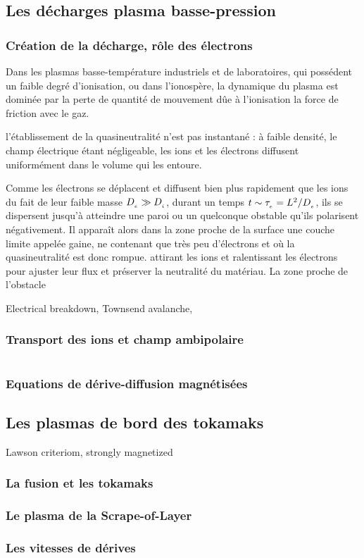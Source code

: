 \begin{refsection}
\subsection{Les décharges plasma basse-pression}
\label{1-transportAmbipolaire}

\subsubsection{Création de la décharge, rôle des électrons}

Dans les plasmas basse-température industriels et de laboratoires, qui
possédent un faible degré d'ionisation, ou dans l'ionospère, la dynamique du
plasma est dominée par la perte de quantité de mouvement dûe à l'ionisation la force de friction avec
le gaz.

l'établissement de la quasineutralité n'est pas instantané : à faible densité,
le champ électrique étant négligeable, les ions et les électrons diffusent
uniformément dans le volume qui les entoure.

Comme les électrons se déplacent et diffusent bien plus rapidement que les ions
du fait de leur faible masse $D_{_{e}}\gg D_{_{i}}$, durant un temps
$t\sim \tau_{_{e}}=L^{{2}}/D_{_{e}}$, ils se dispersent jusqu'à atteindre
une paroi ou un quelconque obstable qu'ils polarisent négativement. Il apparaît
alors dans la zone proche de la surface une couche limite appelée gaine, ne
contenant que très peu d'électrons et où la quasineutralité est donc rompue. 
attirant les ions et ralentissant les électrons pour ajuster leur flux et préserver la neutralité du matériau. La zone proche de l'obstacle 



Electrical breakdown, Townsend avalanche,
\subsubsection{Transport des ions et champ ambipolaire}
\begin{equation}
\label{derivediffusion}
\end{equation}
\subsubsection{Equations de dérive-diffusion magnétisées}

\subsection{Les plasmas de bord des tokamaks}
Lawson criteriom, strongly magnetized
\subsubsection{La fusion et les tokamaks}
\subsubsection{Le plasma de la Scrape-of-Layer}
\subsubsection{Les vitesses de dérives}
\label{vitessesDerive}
%
%
\end{refsection}

